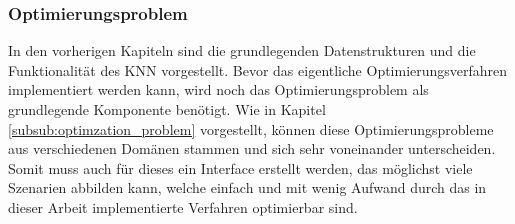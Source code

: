 \subsubsection{Optimierungsproblem}
In den vorherigen Kapiteln sind die grundlegenden Datenstrukturen und die Funktionalität des \ac{KNN} vorgestellt. Bevor das eigentliche Optimierungsverfahren implementiert werden kann, wird noch das Optimierungsproblem als grundlegende Komponente benötigt. Wie in Kapitel \ref{subsub:optimzation_problem} vorgestellt, können diese Optimierungsprobleme aus verschiedenen Domänen stammen und sich sehr voneinander unterscheiden. Somit muss auch für dieses ein Interface erstellt werden, das möglichst viele Szenarien abbilden kann, welche einfach und mit wenig Aufwand durch das in dieser Arbeit implementierte Verfahren optimierbar sind.
\\\\

